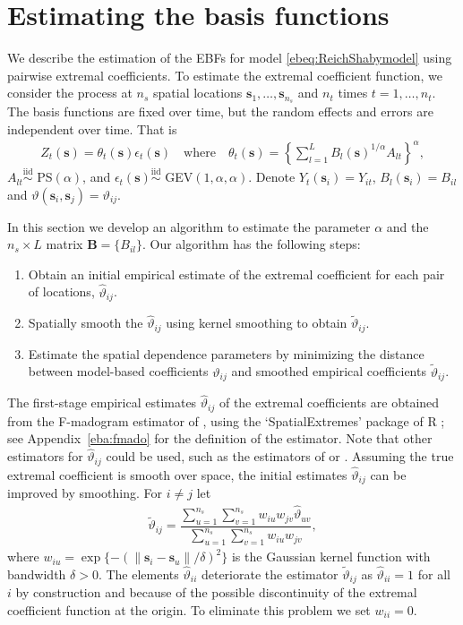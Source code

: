 \documentclass[12pt]{article}
\newcommand{\bB}{\ensuremath{\mathbf{B}}}
\newcommand{\bs}{\ensuremath{\mathbf{s}}}
\newcommand{\iid}{\stackrel{\mathrm{iid}}{\sim}}
\begin{document}
\section{Estimating the basis functions}\label{ebs:estimation} We describe the estimation of the EBFs for model \eqref{ebeq:ReichShabymodel} using pairwise extremal coefficients. 
To estimate the extremal coefficient function, we consider the process at $n_s$ spatial locations $\bs_1,\ldots,\bs_{n_s}$ and $n_t$ times $t=1,\ldots,n_t$.
The basis functions are fixed over time, but the random effects and errors are independent over time.
That is
\begin{align}\label{ebeq:modelZt}
  Z_t(\bs) = \theta_t(\bs) \epsilon_t(\bs) \quad \mathrm{where} \quad \theta_t(\bs) = \left\{ \sum_{l=1}^L B_{l}(\bs)^{1/\alpha}A_{lt}\right\}^{\alpha},
\end{align}
$A_{lt} \iid$ PS$(\alpha)$, and $\epsilon_t(\bs) \iid$ GEV$(1, \alpha, \alpha)$.
Denote $Y_t(\bs_i) = Y_{it}$, $B_l(\bs_i) = B_{il}$ and $\vartheta(\bs_i,\bs_j) = \vartheta_{ij}$.

In this section we develop an algorithm to estimate the parameter $\alpha$ and the $n_s\times L$ matrix $\bB = \{B_{il}\}$. Our algorithm has the following steps:
\begin{enumerate}
  \item Obtain an initial empirical estimate of the extremal coefficient for each pair of locations, ${\hat \vartheta}_{ij}$.
  \item Spatially smooth the ${\hat \vartheta}_{ij}$ using kernel smoothing to obtain ${\tilde \vartheta}_{ij}$.
  \item Estimate the spatial dependence parameters by minimizing the distance between model-based coefficients $\vartheta_{ij}$ and smoothed empirical coefficients ${\tilde \vartheta}_{ij}$.
\end{enumerate}

The first-stage empirical estimates ${\hat \vartheta}_{ij}$ of the extremal coefficients are obtained from the F-madogram estimator of \citet{Cooley2006}, using the `SpatialExtremes' \citep{Ribatet2015} package of R \citep{Rmanual}; see Appendix~\ref{eba:fmado} for the definition of the estimator. Note that other estimators for ${\hat \vartheta}_{ij}$ could be used, such as the estimators of \citet{Smith1990} or \citet{Schlather2003}. 
Assuming the true extremal coefficient is smooth over space, the initial estimates ${\hat \vartheta}_{ij}$ can be improved by smoothing. For $i\neq j$ let
\begin{align} \label{ebeq:EChat2}
  {\tilde \vartheta}_{ij} = \dfrac{ \sum_{u=1}^{n_s}\sum_{v=1}^{n_s} w_{iu}w_{jv}{\hat \vartheta}_{uv}}
  {\sum_{u=1}^{n_s}\sum_{v=1}^{n_s} w_{iu}w_{jv}},
\end{align}
where $w_{iu} = \exp\{- (\| \bs_i-\bs_u \|/\delta)^2\}$ is the Gaussian kernel function with bandwidth $\delta>0$.
The elements ${\hat \vartheta}_{ii}$ deteriorate the estimator ${\tilde \vartheta}_{ij}$ as ${\hat \vartheta}_{ii}=1$ for all $i$ by construction and because of the possible discontinuity of the extremal coefficient function at the origin. To eliminate this problem we set $w_{ii}=0$.
\end{document}
